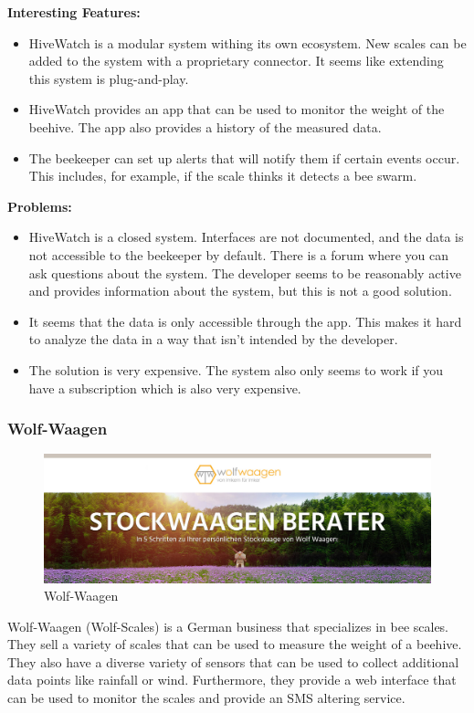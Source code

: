\newpage
\textbf{Interesting Features:}
\begin{itemize}
    \item HiveWatch is a modular system withing its own ecosystem. New scales can be added to the system with a proprietary connector. It seems like extending this system is plug-and-play.
    \item HiveWatch provides an app that can be used to monitor the weight of the beehive. The app also provides a history of the measured data.
    \item The beekeeper can set up alerts that will notify them if certain events occur. This includes, for example, if the scale thinks it detects a bee swarm.
\end{itemize}
\textbf{Problems:}
\begin{itemize}
    \item HiveWatch is a closed system. Interfaces are not documented, and the data is not accessible to the beekeeper by default. There is a forum where you can ask questions about the system. The developer seems to be reasonably active and provides information about the system, but this is not a good solution.
    \item It seems that the data is only accessible through the app. This makes it hard to analyze the data in a way that isn't intended by the developer.
    \item The solution is very expensive. The system also only seems to work if you have a subscription which is also very expensive.
\end{itemize}
\newpage

\subsubsection{Wolf-Waagen}

\begin{figure}
    \centering
    \includegraphics[width=1\textwidth]{figures/wolf_waagen_logo.jpg}
    \caption{Wolf-Waagen}
    \label{fig:wolf_waagen}
\end{figure}
Wolf-Waagen (Wolf-Scales) is a German business that specializes in bee scales. They sell a variety of scales that can be used to measure the weight of a beehive. They also have a diverse variety of sensors that can be used to collect additional data points like rainfall or wind. Furthermore, they provide a web interface that can be used to monitor the scales and provide an SMS altering service.

